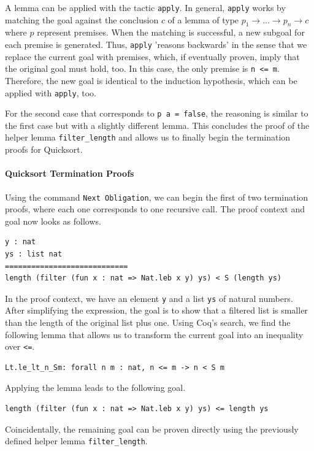 \documentclass[a4paper, 11pt, fleqn, twoside, abstract=on]{scrreprt}
\newcommand{\cinl}[1]{\texttt{#1}}
\begin{document}
A lemma can be applied with the tactic \cinl{apply}.
In general, \cinl{apply} works by matching the goal against the conclusion $c$ of a lemma of type $p_1 \rightarrow \dots \rightarrow p_n \rightarrow c$ where $p$ represent premises.
When the matching is successful, a new subgoal for each premise is generated.
Thus, \cinl{apply} 'reasons backwards' in the sense that we replace the current goal with premises, which, if eventually proven, imply that the original goal must hold, too. 
In this case, the only premise is \cinl{n <= m}.
Therefore, the new goal is identical to the induction hypothesis, which can be applied with \cinl{apply}, too.

For the second case that corresponds to \cinl{p a = false}, the reasoning is similar to the first case but with a slightly different lemma.
This concludes the proof of the helper lemma \cinl{filter_length} and allows us to finally begin the termination proofs for Quicksort.

\paragraph{Quicksort Termination Proofs}
Using the command \cinl{Next Obligation}, we can begin the first of two termination proofs, where each one corresponds to one recursive call.
The proof context and goal now looks as follows.

\begin{verbatim}
y : nat
ys : list nat
============================
length (filter (fun x : nat => Nat.leb x y) ys) < S (length ys)
\end{verbatim}

In the proof context, we have an element \cinl{y} and a list \cinl{ys} of natural numbers.
After simplifying the expression, the goal is to show that a filtered list is smaller than the length of the original list plus one.
Using Coq's search, we find the following lemma that allows us to transform the current goal into an inequality over \cinl{<=}.

\begin{verbatim}
Lt.le_lt_n_Sm: forall n m : nat, n <= m -> n < S m
\end{verbatim}
\noindent
Applying the lemma leads to the following goal.

\begin{verbatim}
length (filter (fun x : nat => Nat.leb x y) ys) <= length ys
\end{verbatim}
\noindent
Coincidentally, the remaining goal can be proven directly using the previously defined helper lemma \cinl{filter_length}.
\end{document}
